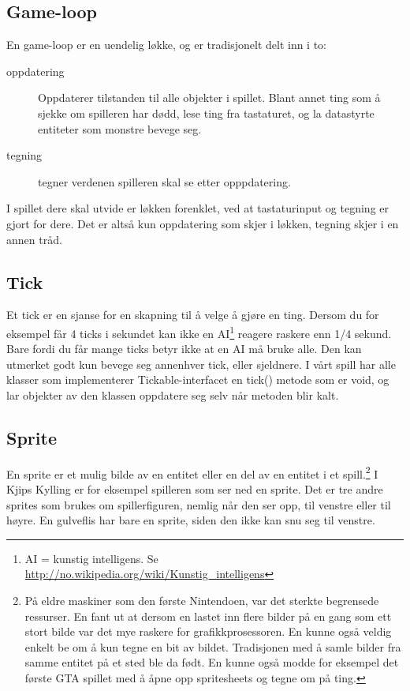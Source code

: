 \documentclass[norsk]{article}
\begin{document}
\subsection{Game-loop}
\label{subsec:game-loop}
En game-loop er en uendelig løkke, og er tradisjonelt delt inn i to:
\begin{description}
\item [oppdatering] Oppdaterer tilstanden til alle objekter i spillet. Blant annet ting som å sjekke om spilleren har dødd, lese ting fra tastaturet, og la datastyrte entiteter som monstre bevege seg.
\item [tegning] tegner verdenen spilleren skal se etter opppdatering.
\end{description}
I spillet dere skal utvide er løkken forenklet, ved at tastaturinput og tegning er gjort for dere.
Det er altså kun oppdatering som skjer i løkken, tegning skjer i en annen tråd.

\subsection{Tick}
\label{subsec:tick}
Et tick er en sjanse for en skapning til å velge å gjøre en ting.
Dersom du for eksempel får 4 ticks i sekundet kan ikke en AI\footnote{AI = kunstig intelligens. Se \url{http://no.wikipedia.org/wiki/Kunstig_intelligens}} reagere raskere enn 1/4 sekund.
Bare fordi du får mange ticks betyr ikke at en AI må bruke alle. Den kan utmerket godt kun bevege seg annenhver tick, eller sjeldnere.
I vårt spill har alle klasser som implementerer Tickable-interfacet en tick() metode som er void, og lar objekter av den klassen oppdatere seg selv når metoden blir kalt.

\subsection{Sprite}
\label{subsec:sprite}
En sprite er et mulig bilde av en entitet eller en del av en entitet i et spill.\footnote{På eldre maskiner som den første Nintendoen, var det sterkte begrensede ressurser. En fant ut at dersom en lastet inn flere bilder på en gang som ett stort bilde var det mye raskere for grafikkprosessoren. En kunne også veldig enkelt be om å kun tegne en bit av bildet. Tradisjonen med å samle bilder fra samme entitet på et sted ble da født. En kunne også modde for eksempel det første GTA spillet med å åpne opp spritesheets og tegne om på ting.}
I Kjips Kylling er for eksempel spilleren som ser ned en sprite. Det er tre andre sprites som brukes om spillerfiguren, nemlig når den ser opp, til venstre eller til høyre.
En gulveflis har bare en sprite, siden den ikke kan snu seg til venstre.
\end{document}

